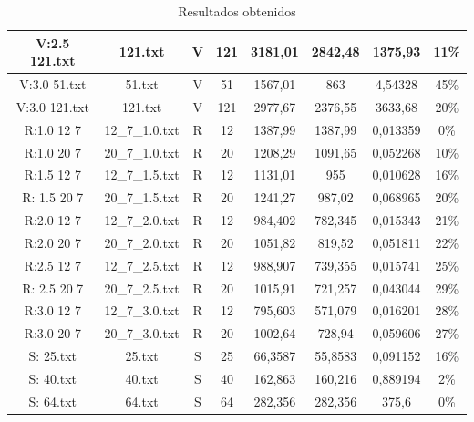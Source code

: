 \documentclass{article}
\begin{document}
\begin{table}[H]
\begin{tabular}{|c|c|c|c|c|c|c|c|}
    V:2.5 121.txt & 121.txt        & V   & 121            & 3181,01        & 2842,48      & 1375,93      & 11\%   \\ \hline
    V:3.0 51.txt  & 51.txt         & V   & 51             & 1567,01        & 863          & 4,54328      & 45\%   \\ \hline
    V:3.0 121.txt & 121.txt        & V   & 121            & 2977,67        & 2376,55      & 3633,68      & 20\%   \\ \hline
    R:1.0 12 7    & 12\_7\_1.0.txt & R   & 12             & 1387,99        & 1387,99      & 0,013359     & 0\%    \\ \hline
    R:1.0 20 7    & 20\_7\_1.0.txt & R   & 20             & 1208,29        & 1091,65      & 0,052268     & 10\%   \\ \hline
    R:1.5 12 7    & 12\_7\_1.5.txt & R   & 12             & 1131,01        & 955          & 0,010628     & 16\%   \\ \hline
    R: 1.5 20 7   & 20\_7\_1.5.txt & R   & 20             & 1241,27        & 987,02       & 0,068965     & 20\%   \\ \hline
    R:2.0 12 7    & 12\_7\_2.0.txt & R   & 12             & 984,402        & 782,345      & 0,015343     & 21\%   \\ \hline
    R:2.0 20 7    & 20\_7\_2.0.txt & R   & 20             & 1051,82        & 819,52       & 0,051811     & 22\%   \\ \hline
    R:2.5 12 7    & 12\_7\_2.5.txt & R   & 12             & 988,907        & 739,355      & 0,015741     & 25\%   \\ \hline
    R: 2.5 20 7   & 20\_7\_2.5.txt & R   & 20             & 1015,91        & 721,257      & 0,043044     & 29\%   \\ \hline
    R:3.0 12 7    & 12\_7\_3.0.txt & R   & 12             & 795,603        & 571,079      & 0,016201     & 28\%   \\ \hline
    R:3.0 20 7    & 20\_7\_3.0.txt & R   & 20             & 1002,64        & 728,94       & 0,059606     & 27\%   \\ \hline
    S: 25.txt     & 25.txt         & S   & 25             & 66,3587        & 55,8583      & 0,091152     & 16\%   \\ \hline
    S: 40.txt     & 40.txt         & S   & 40             & 162,863        & 160,216      & 0,889194     & 2\%    \\ \hline
    S: 64.txt     & 64.txt         & S   & 64             & 282,356        & 282,356      & 375,6          & 0\%    \\ \hline
    \end{tabular}
    \caption{Resultados obtenidos}
    \label{tab:results}
    \end{table}
\end{document}
